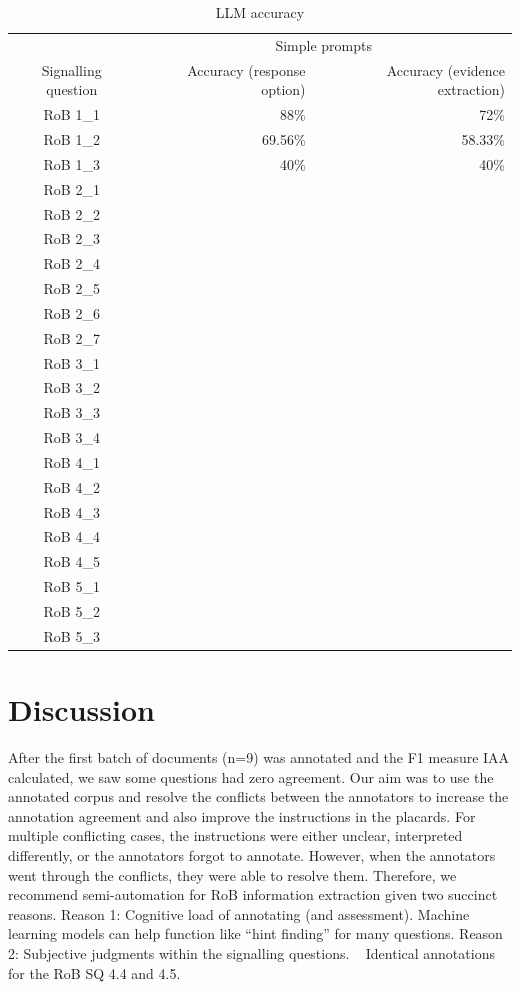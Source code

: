 \documentclass[sn-mathphys,Numbered]{sn-jnl}%
\theoremstyle{thmstyleone}%
\theoremstyle{thmstyletwo}%
\theoremstyle{thmstylethree}%
\begin{document}
%
%
%
\begin{table}[htb]
    \caption{LLM accuracy}
    \label{table:LLM_eval}
    \centering
    \begin{tabular}{crr}
    \hline
     & \multicolumn{2}{c}{Simple prompts} \\
        Signalling question & Accuracy (response option) & Accuracy (evidence extraction) \\ 
    \hline
        RoB 1\_1 & 88\% & 72\% \\ 
        RoB 1\_2 & 69.56\% & 58.33\%  \\ 
        RoB 1\_3 & 40\% & 40\% \\ 
        RoB 2\_1 & &  \\ 
        RoB 2\_2 & &  \\ 
        RoB 2\_3 & &  \\ 
        RoB 2\_4 & &  \\ 
        RoB 2\_5 & &  \\ 
        RoB 2\_6 & &  \\ 
        RoB 2\_7 & &  \\ 
        RoB 3\_1 & &  \\ 
        RoB 3\_2 & &  \\ 
        RoB 3\_3 & &  \\ 
        RoB 3\_4 & &  \\ 
        RoB 4\_1 & & \\ 
        RoB 4\_2 & & \\ 
        RoB 4\_3 & &  \\ 
        RoB 4\_4 & &  \\ 
        RoB 4\_5 & &  \\ 
        RoB 5\_1 & &  \\ 
        RoB 5\_2 & &  \\ 
        RoB 5\_3 & &  \\ \hline
    \end{tabular}
\end{table}
%
%
%
\section{Discussion}
\label{sec:discussion}
%
After the first batch of documents (n=9) was annotated and the F1 measure IAA calculated, we saw some questions had zero agreement.
Our aim was to use the annotated corpus and resolve the conflicts between the annotators to increase the annotation agreement and also improve the instructions in the placards.
For multiple conflicting cases, the instructions were either unclear, interpreted differently, or the annotators forgot to annotate.
However, when the annotators went through the conflicts, they were able to resolve them.
Therefore, we recommend semi-automation for RoB information extraction given two succinct reasons.
Reason 1: Cognitive load of annotating (and assessment). Machine learning models can help function like ``hint finding'' for many questions.
Reason 2: Subjective judgments within the signalling questions.
~\cite{loef2022interrater}
Identical annotations for the RoB SQ 4.4 and 4.5. %
\end{document}
